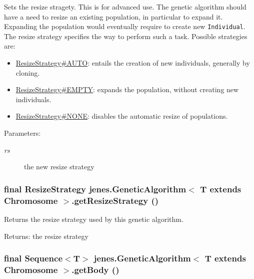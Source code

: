 Sets the resize stragety. This is for advanced use. The genetic algorithm should have a need to resize an existing population, in particular to expand it. Expanding the population would eventually require to create new {\tt Individual}. The resize strategy specifies the way to perform such a task. Possible strategies are: \begin{itemize}
\item \hyperlink{}{ResizeStrategy\#AUTO}: entails the creation of new individuals, generally by cloning. \item \hyperlink{}{ResizeStrategy\#EMPTY}: expands the population, without creating new individuals. \item \hyperlink{}{ResizeStrategy\#NONE}: disables the automatic resize of populations. \end{itemize}


\begin{Desc}
\item[Parameters:]
\begin{description}
\item[{\em rs}]the new resize strategy \end{description}
\end{Desc}
\hypertarget{classjenes_1_1_genetic_algorithm_3_01_t_01extends_01_chromosome_01_4_379c5a3789ba72941a081d32fbcc4474}{
\subsubsection[getResizeStrategy]{\setlength{\rightskip}{0pt plus 5cm}final {\bf ResizeStrategy} jenes.GeneticAlgorithm$<$ T extends Chromosome $>$.getResizeStrategy ()}}
\label{classjenes_1_1_genetic_algorithm_3_01_t_01extends_01_chromosome_01_4_379c5a3789ba72941a081d32fbcc4474}


Returns the resize strategy used by this genetic algorithm. 

\begin{Desc}
\item[Returns:]the resize strategy \end{Desc}
\hypertarget{classjenes_1_1_genetic_algorithm_3_01_t_01extends_01_chromosome_01_4_eab54a329fb6df5686a2fce4a8a8727a}{
\subsubsection[getBody]{\setlength{\rightskip}{0pt plus 5cm}final Sequence$<$T$>$ jenes.GeneticAlgorithm$<$ T extends Chromosome $>$.getBody ()}}
\label{classjenes_1_1_genetic_algorithm_3_01_t_01extends_01_chromosome_01_4_eab54a329fb6df5686a2fce4a8a8727a}


